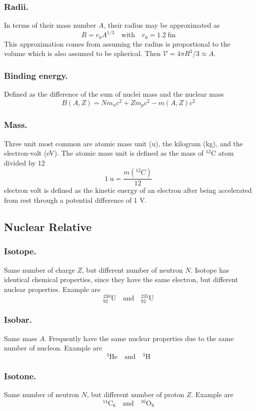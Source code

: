 \documentclass[../../../main.tex]{subfiles}
\begin{document}
\subsubsection*{Radii.} In terms of their mass number $A$, their radius may be approximated as 
\begin{equation*}
    R=r_0A^{1/3}\quad\text{with}\quad r_0=1.2\;\text{fm}
\end{equation*}
This approximation comes from assuming the radius is proportional to the volume which is also assumed to be spherical. Then $\mathcal{V}=4\pi R^3/3\approx A$. 

\subsubsection*{Binding energy.} Defined as the difference of the sum of nuclei mass and the nuclear mass 
\begin{equation*}
    B(A,Z)=Nm_nc^2+Zm_pc^2-m(A,Z)c^2
\end{equation*} 

\subsubsection*{Mass.} Three unit most common are atomic mass unit (u), the kilogram (kg), and the electron-volt (eV). The atomic mass unit is defined as the mass of $^{12}$C atom divided by 12
\begin{equation*}
    1\;\text{u}=\frac{m (^{12}C)}{12}
\end{equation*}
electron volt is defined as the kinetic energy of an electron after being accelerated from rest through a potential diﬀerence of 1 V.

\subsection*{Nuclear Relative}
\subsubsection*{Isotope.} Same number of charge $Z$, but different number of neutron $N$. Isotope has identical chemical properties, since they have the same electron, but different nuclear properties. Example are
\begin{equation*}
    ^{238}_{92}\text{U}\quad\text{and}\quad    ^{235}_{92}\text{U}
\end{equation*}

\subsubsection*{Isobar.} Same mass $A$. Frequently have the same nuclear properties due to the same number of nucleon. Example are
\begin{equation*}
    ^{3}\text{He}\quad\text{and}\quad    ^{3}\text{H}
\end{equation*}

\subsubsection*{Isotone.} Same number of neutron $N$, but different number of proton $Z$. Example are
\begin{equation*}
    ^{14}\text{C}_6\quad\text{and}\quad    ^{16}\text{O}_8
\end{equation*}
\end{document}
